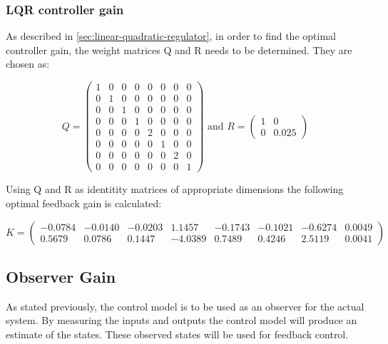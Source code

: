 \subsubsection{LQR controller gain}
As described in \cref{sec:linear-quadratic-regulator}, in order to find the optimal controller gain, the weight matrices Q and R needs to be determined. They are chosen as: 

\begin{equation}
	Q = 
	\left(\begin{array}{cccccccc}
		1 & 0 & 0 & 0 & 0 & 0 & 0 & 0  \\
		0 & 1 & 0 & 0 & 0 & 0 & 0 & 0  \\
		0 & 0 & 1 & 0 & 0 & 0 & 0 & 0  \\
		0 & 0 & 0 & 1 & 0 & 0 & 0 & 0  \\
		0 & 0 & 0 & 0 & 2 & 0 & 0 & 0  \\
		0 & 0 & 0 & 0 & 0 & 1 & 0 & 0  \\
		0 & 0 & 0 & 0 & 0 & 0 & 2 & 0  \\
		0 & 0 & 0 & 0 & 0 & 0 & 0 & 1	  
	\end{array}\right) 
	\text{  and  }
	R = 
		\left(\begin{array}{cc}
		1 & 0  \\
		0 & 0.025  
	\end{array}\right) 
\end{equation}



 
Using Q and R as identitity matrices of appropriate dimensions the following optimal feedback gain is calculated:

\begin{equation}
	K =
	\left(\begin{array}{cccccccccc}
		-0.0784 &  -0.0140 &  -0.0203 &   1.1457 &  -0.1743 &  -0.1021 &  -0.6274 &   0.0049 \\
		0.5679 &   0.0786 &   0.1447 &  -4.0389 &   0.7489 &   0.4246 &   2.5119 &   0.0041
	\end{array}\right) 
\end{equation}

\subsection{Observer Gain}\label{sec:observer-gain}
As stated previously, the control model is to be used as an observer for the actual system. By measuring the inputs and outputs the control model will produce an estimate of the states. These observed states will be used for feedback control. \\

